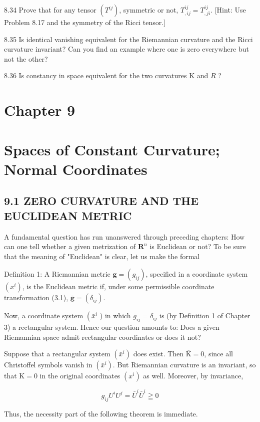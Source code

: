 \documentclass[10pt]{article}
\begin{document}
8.34 Prove that for any tensor $\left(T^{i j}\right)$, symmetric or not, $T_{, i j}^{i j}=T_{, j i}^{i j}$. [Hint: Use Problem 8.17 and the symmetry of the Ricci tensor.]

8.35 Is identical vanishing equivalent for the Riemannian curvature and the Ricci curvature invariant? Can you find an example where one is zero everywhere but not the other?

8.36 Is constancy in space equivalent for the two curvatures $\mathrm{K}$ and $R$ ?

\section*{Chapter 9}
\section*{Spaces of Constant Curvature; Normal Coordinates}
\subsection*{9.1 ZERO CURVATURE AND THE EUCLIDEAN METRIC}
A fundamental question has run unanswered through preceding chapters: How can one tell whether a given metrization of $\mathbf{R}^{n}$ is Euclidean or not? To be sure that the meaning of "Euclidean" is clear, let us make the formal

Definition 1: A Riemannian metric $\mathbf{g}=\left(g_{i j}\right)$, specified in a coordinate system $\left(x^{i}\right)$, is the Euclidean metric if, under some permissible coordinate transformation (3.1), $\overline{\mathbf{g}}=\left(\delta_{i j}\right)$.

Now, a coordinate system $\left(\bar{x}^{i}\right.$ ) in which $\bar{g}_{i j}=\delta_{i j}$ is (by Definition 1 of Chapter 3) a rectangular system. Hence our question amounts to: Does a given Riemannian space admit rectangular coordinates or does it not?

Suppose that a rectangular system $\left(\bar{x}^{i}\right)$ does exist. Then $\overline{\mathrm{K}}=0$, since all Christoffel symbols vanish in $\left(\bar{x}^{i}\right)$. But Riemannian curvature is an invariant, so that $\mathrm{K}=0$ in the original coordinates $\left(x^{i}\right)$ as well. Moreover, by invariance,

$$
g_{i j} U^{i} U^{j}=\bar{U}^{i} \bar{U}^{i} \geqq 0
$$

Thus, the necessity part of the following theorem is immediate.
\end{document}
